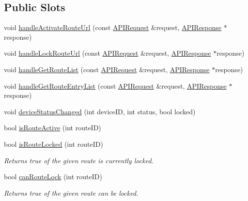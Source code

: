 \subsection*{Public Slots}
\begin{DoxyCompactItemize}
\item 
void \hyperlink{class_a_p_i_route_a23f1b30a95e806760968daf23e2b3fa1}{handle\+Activate\+Route\+Url} (const \hyperlink{class_a_p_i_request}{A\+P\+I\+Request} \&request, \hyperlink{class_a_p_i_response}{A\+P\+I\+Response} $\ast$response)
\item 
void \hyperlink{class_a_p_i_route_a2edf94cf41f8fba5b1ed5f5eca217968}{handle\+Lock\+Route\+Url} (const \hyperlink{class_a_p_i_request}{A\+P\+I\+Request} \&request, \hyperlink{class_a_p_i_response}{A\+P\+I\+Response} $\ast$response)
\item 
void \hyperlink{class_a_p_i_route_a62f9b2e4addb8b60087a02a3e93c1abf}{handle\+Get\+Route\+List} (const \hyperlink{class_a_p_i_request}{A\+P\+I\+Request} \&request, \hyperlink{class_a_p_i_response}{A\+P\+I\+Response} $\ast$response)
\item 
void \hyperlink{class_a_p_i_route_a95f38f3fb39801deba8d4a39e14686d2}{handle\+Get\+Route\+Entry\+List} (const \hyperlink{class_a_p_i_request}{A\+P\+I\+Request} \&request, \hyperlink{class_a_p_i_response}{A\+P\+I\+Response} $\ast$response)
\item 
void \hyperlink{class_a_p_i_route_a2ddf0d77318dcb66acc7d754c81151b3}{device\+Status\+Changed} (int device\+ID, int status, bool locked)
\item 
bool \hyperlink{class_a_p_i_route_afbd5b3b86ddacee31d16330de4d069df}{is\+Route\+Active} (int route\+ID)
\item 
\mbox{\label{class_a_p_i_route_a78e979b1ae56db76fb77de3cb8e54da9}} 
bool \hyperlink{class_a_p_i_route_a78e979b1ae56db76fb77de3cb8e54da9}{is\+Route\+Locked} (int route\+ID)
\begin{DoxyCompactList}\small\item\em Returns true of the given route is currently locked. \end{DoxyCompactList}\item 
bool \hyperlink{class_a_p_i_route_ab02063d3a9335d9e3e3ad9160dbb626b}{can\+Route\+Lock} (int route\+ID)
\begin{DoxyCompactList}\small\item\em Returns true of the given route can be locked. \end{DoxyCompactList}\end{DoxyCompactItemize}
